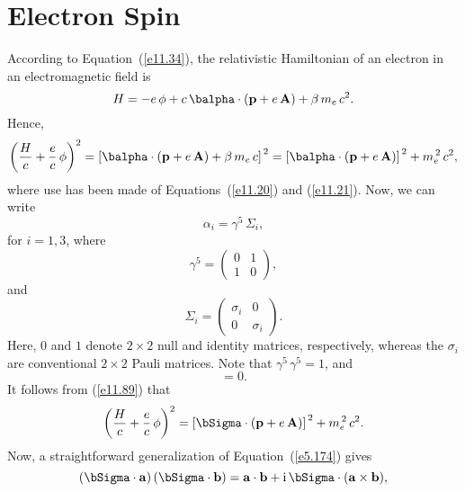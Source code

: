 \section{Electron Spin}
According to Equation~(\ref{e11.34}),  the relativistic Hamiltonian of an electron in an electromagnetic
field is
\begin{equation}\label{e11.87}
H =-e\,\phi + c\,\balpha\cdot({\bf p}+e\,{\bf A})+ \beta\,m_e\,c^2.
\end{equation}
Hence,
\begin{equation}\label{e11.89}
\left(\frac{H}{c}+\frac{e}{c}\,\phi\right)^2 = \left[\balpha\cdot({\bf p}+e\,{\bf A})+ \beta\,m_e\,c\right]^{\,2} = \left[\balpha\cdot({\bf p}+e\,{\bf A})\right]^{\,2} + m_e^{\,2}\,c^2,
\end{equation}
where use has been made of Equations~(\ref{e11.20}) and (\ref{e11.21}). 
Now, we can write
\begin{equation}
\alpha_i = \gamma^5\,\Sigma_i,
\end{equation}
for $i=1,3$, where
\begin{equation}
\gamma^5 = \left(\begin{array}{cc} 0& 1\\[0.5ex]1 & 0\end{array}\right),
\end{equation}
and
\begin{equation}\label{e11.92f}
\Sigma_i = \left(\begin{array}{cc} \sigma_i& 0\\[0.5ex]0& \sigma_i\end{array}\right).
\end{equation}
Here, $0$ and $1$ denote $2\times 2$ null and identity matrices, respectively, whereas the $\sigma_i$ are conventional
$2\times 2$ Pauli matrices. Note that $\gamma^5\,\gamma^5=1$, and
\begin{equation}
[\gamma^5, \Sigma_i]=0.
\end{equation}
 It follows from (\ref{e11.89}) that
\begin{equation}
\left(\frac{H}{c}+\frac{e}{c}\,\phi\right)^2 =  \left[\bSigma\cdot({\bf p}+e\,{\bf A})\right]^{\,2} + m_e^{\,2}\,c^2.
\end{equation}
Now, a straightforward generalization of Equation~(\ref{e5.174}) gives
\begin{equation}\label{e11.93}
(\bSigma \cdot {\bf a} ) \,(\bSigma \cdot {\bf b}) = {\bf a} \cdot {\bf b}
+{\rm i}\,\bSigma\cdot ({\bf a} \times {\bf b}),
\end{equation}
